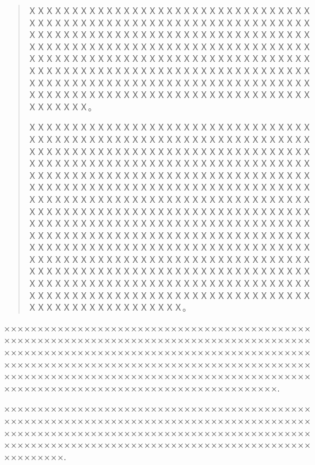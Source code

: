 \documentclass[a4paper]{ltxdoc}
\numberwithin{equation}{section}
\begin{document}





\begin{abstract}
ＸＸＸＸＸＸＸＸＸＸＸＸＸＸＸＸＸＸＸＸＸＸＸＸＸＸＸＸＸＸＸＸＸＸＸＸＸＸＸＸＸＸＸＸＸＸＸＸＸＸＸＸＸＸＸＸＸＸＸＸＸＸＸＸＸＸＸＸＸＸＸＸＸＸＸＸＸＸＸＸＸＸＸＸＸＸＸＸＸＸＸＸＸＸＸＸＸＸＸＸＸＸＸＸＸＸＸＸＸＸＸＸＸＸＸＸＸＸＸＸＸＸＸＸＸＸＸＸＸＸＸＸＸＸＸＸＸＸＸＸＸＸＸＸＸＸＸＸＸＸＸＸＸＸＸＸＸＸＸＸＸＸＸＸＸＸＸＸＸＸＸＸＸＸＸＸＸＸＸＸＸＸＸＸＸＸＸＸＸＸＸＸＸＸＸＸＸＸＸＸＸＸＸＸＸＸＸＸＸＸＸＸＸＸＸＸＸＸＸＸＸＸＸＸＸＸＸＸＸＸＸＸＸＸＸＸＸＸＸＸＸＸＸＸＸＸＸＸＸＸＸＸＸＸＸＸＸＸＸＸＸＸＸＸＸＸＸＸＸＸＸ。

ＸＸＸＸＸＸＸＸＸＸＸＸＸＸＸＸＸＸＸＸＸＸＸＸＸＸＸＸＸＸＸＸＸＸＸＸＸＸＸＸＸＸＸＸＸＸＸＸＸＸＸＸＸＸＸＸＸＸＸＸＸＸＸＸＸＸＸＸＸＸＸＸＸＸＸＸＸＸＸＸＸＸＸＸＸＸＸＸＸＸＸＸＸＸＸＸＸＸＸＸＸＸＸＸＸＸＸＸＸＸＸＸＸＸＸＸＸＸＸＸＸＸＸＸＸＸＸＸＸＸＸＸＸＸＸＸＸＸＸＸＸＸＸＸＸＸＸＸＸＸＸＸＸＸＸＸＸＸＸＸＸＸＸＸＸＸＸＸＸＸＸＸＸＸＸＸＸＸＸＸＸＸＸＸＸＸＸＸＸＸＸＸＸＸＸＸＸＸＸＸＸＸＸＸＸＸＸＸＸＸＸＸＸＸＸＸＸＸＸＸＸＸＸＸＸＸＸＸＸＸＸＸＸＸＸＸＸＸＸＸＸＸＸＸＸＸＸＸＸＸＸＸＸＸＸＸＸＸＸＸＸＸＸＸＸＸＸＸＸＸＸＸＸＸＸＸＸＸＸＸＸＸＸＸＸＸＸＸＸＸＸＸＸＸＸＸＸＸＸＸＸＸＸＸＸＸＸＸＸＸＸＸＸＸＸＸＸＸＸＸＸＸＸＸＸＸＸＸＸＸＸＸＸＸＸＸＸＸＸＸＸＸＸＸＸＸＸＸＸＸＸＸＸＸＸＸＸＸＸＸＸＸＸＸＸＸＸＸＸＸＸＸＸＸＸＸＸＸＸＸＸＸＸＸＸＸＸＸＸＸＸＸＸＸＸＸＸＸＸＸＸＸＸＸＸＸＸＸＸＸＸＸＸＸＸＸＸＸＸＸＸＸＸＸＸＸＸＸＸＸＸＸＸＸＸＸＸＸＸＸＸＸＸＸＸＸＸＸＸＸＸＸＸＸＸＸＸＸＸＸＸＸＸＸＸＸＸＸＸＸＸＸＸＸＸＸＸＸＸＸＸＸＸＸＸＸＸＸＸＸＸＸＸＸＸＸＸＸＸＸＸＸＸＸＸＸＸＸＸＸＸＸＸ。

\end{abstract}

\begin{abstractEn}
×××××××××××××××××××××××××××××××××××××××××××××××××××××××××××××××××××××××××××××××××××××××××××××××××××××××××××××××××××××××××××××××××××××××××××××××××××××××××××××××××××××××××××××××××××××××××××××××××××××××××××××××××××××××××××××××××××××××××××××××××××××××××××××××××××××××××××××××.

×××××××××××××××××××××××××××××××××××××××××××××××××××××××××××××××××××××××××××××××××××××××××××××××××××××××××××××××××××××××××××××××××××××××××××××××××××××××××××××××××××××××××××××××××××××××××××××××××.
\end{abstractEn}
\end{document}
